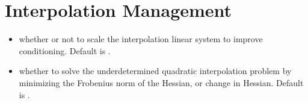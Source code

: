 \documentclass[letterpaper,10pt,english]{sphinxmanual}
\begin{document}
\section{Interpolation Management}
\label{\detokenize{advanced:interpolation-management}}\begin{itemize}
\item {} 
 \sphinxhyphen{} whether or not to scale the interpolation linear system to improve conditioning. Default is .

\item {} 
 \sphinxhyphen{} whether to solve the underdetermined quadratic interpolation problem by minimizing the Frobenius norm of the Hessian, or change in Hessian. Default is .

\end{itemize}
\end{document}
